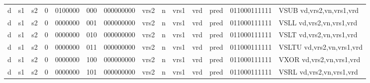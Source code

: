 \begin{landscape}
\begin{table}[p]
\begin{small}
\begin{center}
\begin{tabular}{p{0.08in}@{}p{0.08in}@{}p{0.08in}@{}p{0.08in}@{}p{0.50in}@{}p{0.30in}@{}p{0.08in}@{}p{0.8in}@{}p{0.48in}@{}p{0.32in}@{}p{0.08in}@{}p{0.8in}@{}p{0.8in}@{}p{0.4in}@{}p{0.56in}l}
\multicolumn{1}{|c|}{d} &
\multicolumn{1}{c|}{s1} &
\multicolumn{1}{c|}{s2} &
\multicolumn{1}{c|}{0} &
\multicolumn{1}{c|}{0100000} &
\multicolumn{1}{c|}{000} &
\multicolumn{2}{c|}{000000000} &
\multicolumn{2}{c|}{vrs2} &
\multicolumn{1}{c|}{n} &
\multicolumn{1}{c|}{vrs1} &
\multicolumn{1}{c|}{vrd} &
\multicolumn{1}{c|}{pred} &
\multicolumn{1}{c|}{011000111111} & VSUB vd,vrs2,vn,vrs1,vrd \\
\cline{1-15}
  

\multicolumn{1}{|c|}{d} &
\multicolumn{1}{c|}{s1} &
\multicolumn{1}{c|}{s2} &
\multicolumn{1}{c|}{0} &
\multicolumn{1}{c|}{0000000} &
\multicolumn{1}{c|}{001} &
\multicolumn{2}{c|}{000000000} &
\multicolumn{2}{c|}{vrs2} &
\multicolumn{1}{c|}{n} &
\multicolumn{1}{c|}{vrs1} &
\multicolumn{1}{c|}{vrd} &
\multicolumn{1}{c|}{pred} &
\multicolumn{1}{c|}{011000111111} & VSLL vd,vrs2,vn,vrs1,vrd \\
\cline{1-15}
  

\multicolumn{1}{|c|}{d} &
\multicolumn{1}{c|}{s1} &
\multicolumn{1}{c|}{s2} &
\multicolumn{1}{c|}{0} &
\multicolumn{1}{c|}{0000000} &
\multicolumn{1}{c|}{010} &
\multicolumn{2}{c|}{000000000} &
\multicolumn{2}{c|}{vrs2} &
\multicolumn{1}{c|}{n} &
\multicolumn{1}{c|}{vrs1} &
\multicolumn{1}{c|}{vrd} &
\multicolumn{1}{c|}{pred} &
\multicolumn{1}{c|}{011000111111} & VSLT vd,vrs2,vn,vrs1,vrd \\
\cline{1-15}
  

\multicolumn{1}{|c|}{d} &
\multicolumn{1}{c|}{s1} &
\multicolumn{1}{c|}{s2} &
\multicolumn{1}{c|}{0} &
\multicolumn{1}{c|}{0000000} &
\multicolumn{1}{c|}{011} &
\multicolumn{2}{c|}{000000000} &
\multicolumn{2}{c|}{vrs2} &
\multicolumn{1}{c|}{n} &
\multicolumn{1}{c|}{vrs1} &
\multicolumn{1}{c|}{vrd} &
\multicolumn{1}{c|}{pred} &
\multicolumn{1}{c|}{011000111111} & VSLTU vd,vrs2,vn,vrs1,vrd \\
\cline{1-15}
  

\multicolumn{1}{|c|}{d} &
\multicolumn{1}{c|}{s1} &
\multicolumn{1}{c|}{s2} &
\multicolumn{1}{c|}{0} &
\multicolumn{1}{c|}{0000000} &
\multicolumn{1}{c|}{100} &
\multicolumn{2}{c|}{000000000} &
\multicolumn{2}{c|}{vrs2} &
\multicolumn{1}{c|}{n} &
\multicolumn{1}{c|}{vrs1} &
\multicolumn{1}{c|}{vrd} &
\multicolumn{1}{c|}{pred} &
\multicolumn{1}{c|}{011000111111} & VXOR vd,vrs2,vn,vrs1,vrd \\
\cline{1-15}
  

\multicolumn{1}{|c|}{d} &
\multicolumn{1}{c|}{s1} &
\multicolumn{1}{c|}{s2} &
\multicolumn{1}{c|}{0} &
\multicolumn{1}{c|}{0000000} &
\multicolumn{1}{c|}{101} &
\multicolumn{2}{c|}{000000000} &
\multicolumn{2}{c|}{vrs2} &
\multicolumn{1}{c|}{n} &
\multicolumn{1}{c|}{vrs1} &
\multicolumn{1}{c|}{vrd} &
\multicolumn{1}{c|}{pred} &
\multicolumn{1}{c|}{011000111111} & VSRL vd,vrs2,vn,vrs1,vrd \\
\cline{1-15}
  


\end{tabular}
\end{center}
\end{small}
\end{table}
\end{landscape}
